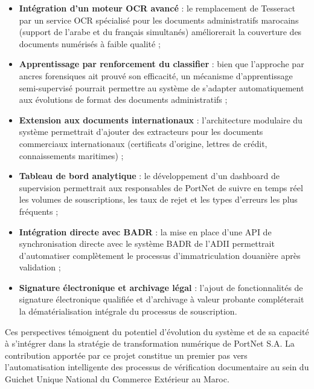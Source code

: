 \begin{itemize}[leftmargin=*, itemsep=6pt]
    \item \textbf{Int\'{e}gration d'un moteur OCR avanc\'{e}} : le remplacement de Tesseract par un service OCR sp\'{e}cialis\'{e} pour les documents administratifs marocains (support de l'arabe et du fran\c{c}ais simultan\'{e}s) am\'{e}liorerait la couverture des documents num\'{e}ris\'{e}s \`{a} faible qualit\'{e} ;

    \item \textbf{Apprentissage par renforcement du classifier} : bien que l'approche par ancres forensiques ait prouv\'{e} son efficacit\'{e}, un m\'{e}canisme d'apprentissage semi-supervis\'{e} pourrait permettre au syst\`{e}me de s'adapter automatiquement aux \'{e}volutions de format des documents administratifs ;

    \item \textbf{Extension aux documents internationaux} : l'architecture modulaire du syst\`{e}me permettrait d'ajouter des extracteurs pour les documents commerciaux internationaux (certificats d'origine, lettres de cr\'{e}dit, connaissements maritimes) ;

    \item \textbf{Tableau de bord analytique} : le d\'{e}veloppement d'un dashboard de supervision permettrait aux responsables de PortNet de suivre en temps r\'{e}el les volumes de souscriptions, les taux de rejet et les types d'erreurs les plus fr\'{e}quents ;

    \item \textbf{Int\'{e}gration directe avec BADR} : la mise en place d'une API de synchronisation directe avec le syst\`{e}me BADR de l'ADII permettrait d'automatiser compl\`{e}tement le processus d'immatriculation douani\`{e}re apr\`{e}s validation ;

    \item \textbf{Signature \'{e}lectronique et archivage l\'{e}gal} : l'ajout de fonctionnalit\'{e}s de signature \'{e}lectronique qualifi\'{e}e et d'archivage \`{a} valeur probante compl\'{e}terait la d\'{e}mat\'{e}rialisation int\'{e}grale du processus de souscription.
\end{itemize}

Ces perspectives t\'{e}moignent du potentiel d'\'{e}volution du syst\`{e}me et de sa capacit\'{e} \`{a} s'int\'{e}grer dans la strat\'{e}gie de transformation num\'{e}rique de PortNet S.A. La contribution apport\'{e}e par ce projet constitue un premier pas vers l'automatisation intelligente des processus de v\'{e}rification documentaire au sein du Guichet Unique National du Commerce Ext\'{e}rieur au Maroc.

